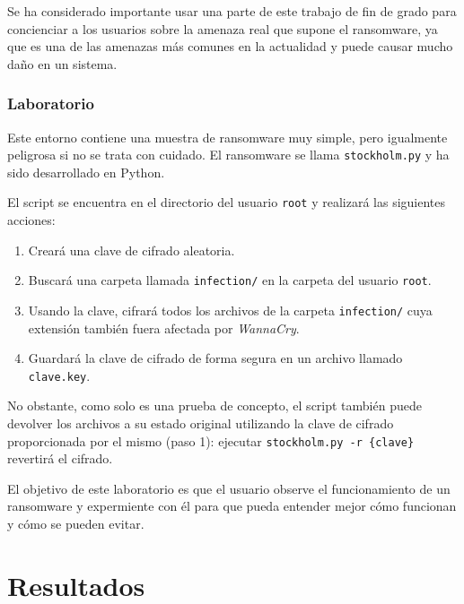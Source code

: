             Se ha considerado importante usar una parte de este trabajo de fin de grado para concienciar a los usuarios sobre la amenaza real que supone el ransomware, ya que es una de las amenazas más comunes en la actualidad y puede causar mucho daño en un sistema.

        \subsection{Laboratorio}

            Este entorno contiene una muestra de ransomware muy simple, pero igualmente peligrosa si no se trata con cuidado. El ransomware se llama \texttt{stockholm.py} y ha sido desarrollado en Python.
            
            El script se encuentra en el directorio del usuario \texttt{root} y realizará las siguientes acciones:
            
            \begin{enumerate}
                \item Creará una clave de cifrado aleatoria.
                \item Buscará una carpeta llamada \texttt{infection/} en la carpeta del usuario \texttt{root}.
                \item Usando la clave, cifrará todos los archivos de la carpeta \texttt{infection/} cuya extensión también fuera afectada por \textit{WannaCry}.
                \item Guardará la clave de cifrado de forma segura en un archivo llamado \texttt{clave.key}.
            \end{enumerate}

            No obstante, como solo es una prueba de concepto, el script también puede devolver los archivos a su estado original utilizando la clave de cifrado proporcionada por el mismo (paso 1): ejecutar \texttt{stockholm.py -r \{clave\}} revertirá el cifrado.
            
            El objetivo de este laboratorio es que el usuario observe el funcionamiento de un ransomware y expermiente con él para que pueda entender mejor cómo funcionan y cómo se pueden evitar.

            \cleardoublepage



\chapter{Resultados}

